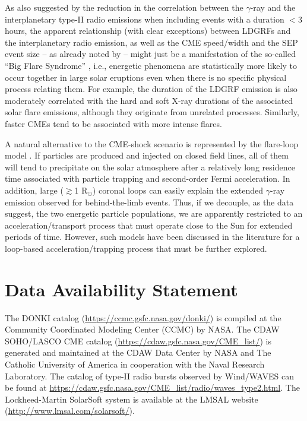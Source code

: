 \documentclass{aastex61}
\begin{document}
As also suggested by the reduction in the correlation between the $\gamma$-ray and the interplanetary type-II radio emissions when including events with a duration $<$3 hours, 
the apparent relationship (with clear exceptions) between LDGRFs and the interplanetary radio emission, as well as the CME speed/width and the SEP event size -- as already noted by \citet{ref:SHARE2018} -- might just be a manifestation of the so-called ``Big Flare Syndrome'' \citep{ref:KAHLER1982}, 
i.e., energetic phenomena are statistically more likely to occur together in large solar eruptions even when there is no specific physical process relating them.
For example, the duration of the LDGRF emission is also moderately correlated with the hard and soft X-ray durations of the associated solar flare emissions, although they originate from unrelated processes. Similarly, faster CMEs tend to be associated with more intense flares.

A natural alternative to the CME-shock scenario is represented by the flare-loop model \citep{ref:RYANLEE1991,ref:MANDZHAVIDZERAMATY1992,ref:CHUPPRYAN2009,ref:GRECHNEV2018,ref:RYAN2018,ref:DENOLFO2019,ref:RYAN2019,ref:DENOLFO2021}. If particles are produced and injected on closed field lines, all of them will tend to precipitate on the solar atmosphere after a relatively long residence time associated with particle trapping and second-order Fermi acceleration.
In addition, large ($\gtrsim$1 R$_{\odot}$) coronal loops can easily explain the extended $\gamma$-ray emission observed for behind-the-limb events. 
Thus, if we decouple, as the data suggest, the two energetic particle populations, we are apparently restricted to an acceleration/transport process that must operate close to the Sun for extended periods of time. However, such models have been discussed in the literature for a loop-based acceleration/trapping process that must be further explored.



\section*{Data Availability Statement}
The DONKI catalog (\url{https://ccmc.gsfc.nasa.gov/donki/}) is compiled at the Community Coordinated Modeling Center (CCMC) by NASA.
The CDAW SOHO/LASCO CME catalog (\url{https://cdaw.gsfc.nasa.gov/CME_list/}) is generated and maintained at the CDAW Data Center by NASA and The Catholic University of America in cooperation with the Naval Research Laboratory. 
The catalog of type-II radio bursts observed by Wind/WAVES can be found at \url{https://cdaw.gsfc.nasa.gov/CME_list/radio/waves_type2.html}. The Lockheed-Martin SolarSoft system is available at the LMSAL website (\url{http://www.lmsal.com/solarsoft/}).
\end{document}
